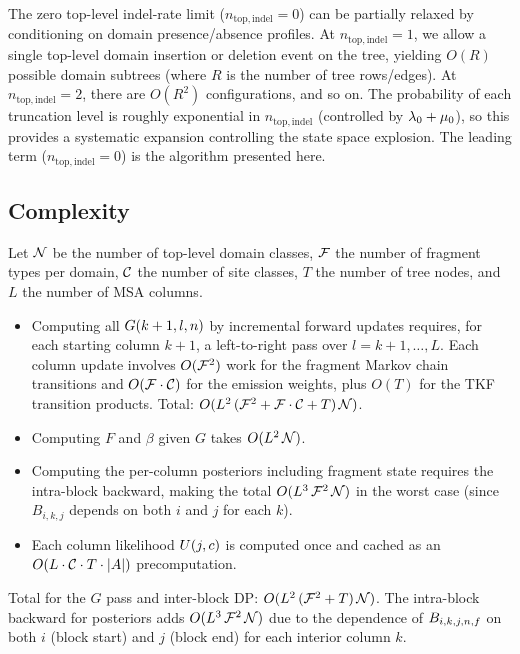 \begin{remark}
\label{rem:relaxing-top-level}
The zero top-level indel-rate limit ($n_{\mathrm{top,indel}} = 0$) can be
partially relaxed by conditioning on domain presence/absence profiles.
At $n_{\mathrm{top,indel}} = 1$, we allow a single top-level domain
insertion or deletion event on the tree, yielding $O(R)$ possible
domain subtrees (where $R$ is the number of tree rows/edges).
At $n_{\mathrm{top,indel}} = 2$, there are $O(R^2)$ configurations, and
so on. The probability of each truncation level is roughly exponential
in $n_{\mathrm{top,indel}}$ (controlled by $\lambda_0 + \mu_0$),
so this provides a systematic expansion controlling the state space
explosion. The leading term ($n_{\mathrm{top,indel}} = 0$) is the algorithm
presented here.
\end{remark}

\subsection{Complexity}
\label{sec:partition-complexity}

Let $\mathcal{N}$ be the number of top-level domain classes, $\mathcal{F}$ the
number of fragment types per domain, $\mathcal{C}$ the number of site
classes, $T$ the number of tree nodes, and $L$ the number of MSA columns.
\begin{itemize}
  \item Computing all $G(k+1,l,n)$ by incremental forward updates
    requires, for each starting column $k+1$, a left-to-right pass over
    $l = k+1, \dots, L$. Each column update involves $O(\mathcal{F}^2)$ work
    for the fragment Markov chain transitions and $O(\mathcal{F} \cdot \mathcal{C})$
    for the emission weights, plus $O(T)$ for the TKF transition products.
    Total: $O(L^2\,(\mathcal{F}^2 + \mathcal{F} \cdot \mathcal{C} + T)\,\mathcal{N})$.
  \item Computing $F$ and $\beta$ given $G$ takes $O(L^2\,\mathcal{N})$.
  \item Computing the per-column posteriors including fragment state
    requires the intra-block backward, making the total
    $O(L^3\,\mathcal{F}^2\,\mathcal{N})$ in the worst case (since $B_{i,k,j}$
    depends on both $i$ and $j$ for each $k$).
  \item Each column likelihood $U(j, c)$ is computed once and cached
    as an $O(L \cdot \mathcal{C} \cdot T \cdot |A|)$ precomputation.
\end{itemize}
Total for the $G$ pass and inter-block DP: $O(L^2\,(\mathcal{F}^2 + T)\,\mathcal{N})$.
The intra-block backward for posteriors adds $O(L^3\,\mathcal{F}^2\,\mathcal{N})$
due to the dependence of $B_{i,k,j,n,f}$ on both $i$ (block start)
and $j$ (block end) for each interior column $k$.

